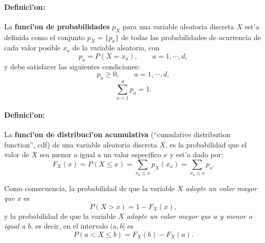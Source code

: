 

\paragraph{Definici'on:} La \textbf{funci'on de probabilidades} $p_X$ para una variable aleatoria discreta $X$ est'a definida como el conjunto $p_X=\{p_a\}$ de todas las probabilidades de ocurrencia de cada valor posible $x_a$ de la variable aleatoria, con
\begin{equation}
p_a=P(X=x_a) , \qquad   a=1,\cdots, d,
\end{equation}
y debe satisfacer las siguientes condiciones:
\begin{equation}
p_a\geq 0, \qquad  a=1,\cdots, d,
\end{equation}
\begin{equation}
\sum_{a=1}^d p_a=1.
\end{equation}
		 
\paragraph{Definici'on:} La \textbf{funci'on de distribuci'on acumulativa} (``cumulative distribution function'', cdf) de una variable aleatoria discreta $X$, es la probabilidad que el valor de $X$ sea menor o igual a un valor especifico $x$ y est'a dado por:
\begin{equation}
F_X(x)=P(X\le x)=\sum_{x_a\le x}p_X(x_a)=\sum_{x_a\le x}p_a.
\end{equation}
		
Como consecuencia, la probabilidad de que la variable $X$ \textit{adopte un valor mayor que $x$} es
\begin{equation}
P(X> x) = 1 - F_X(x),
\end{equation}
y la probabilidad de que la variable $X$ \textit{adopte un valor mayor que $a$ y menor o igual a $b$}, es decir, en el intervalo $(a,b]$ es
\begin{equation}
P(a<X\le b) = F_X(b)-F_X(a).
\end{equation}
%		 
 
